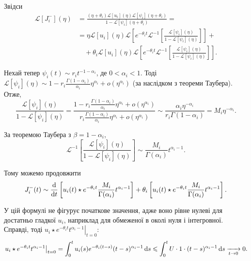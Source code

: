 Звідси
\begin{equation}
    \begin{aligned}
        \mathcal{L} [J_i^-](\eta)
        &= \frac{(\eta + \theta_i) \mathcal{L} [u_i](\eta) \mathcal{L}[\psi_i](\eta + \theta_i)}{1 - \mathcal{L} [\psi_i](\eta + \theta_i)} = \\
        &= \eta \mathcal{L} [u_i](\eta) \mathcal{L} \left[ e^{-\theta_i t} \mathcal{L}^{-1} \left[ \frac{\mathcal{L}[\psi_i](\eta)}{1 - \mathcal{L}[\psi_i](\eta)} \right] \right] + \\
        &\quad + \theta_i \mathcal{L} [u_i](\eta) \mathcal{L} \left[ e^{-\theta_i t} \mathcal{L}^{-1} \left[ \frac{\mathcal{L}[\psi_i](\eta)}{1 - \mathcal{L}[\psi_i](\eta)} \right] \right].
    \end{aligned}
\end{equation}

Нехай тепер $\psi_i(t) \sim r_i t^{-1 - \alpha_i}$, де $0 < \alpha_i < 1$. Тоді $\mathcal{L}[\psi_i](\eta) \sim 1 - r_i \frac{\Gamma(1 - \alpha_i)}{\alpha_i} \eta^{\alpha_i} + o(\eta^{\alpha_i})$ (за наслідком з теореми Таубера). Отже,
\begin{equation}
    \frac{\mathcal{L}[\psi_i](\eta)}{1 - \mathcal{L}[\psi_i](\eta)} = \frac{1 - r_i \frac{\Gamma(1 - \alpha_i)}{\alpha_i} \eta^{\alpha_i} + o(\eta^{\alpha_i})}{r_i \frac{\Gamma(1 - \alpha_i)}{\alpha_i} \eta^{\alpha_i} + o(\eta^{\alpha_i})} \sim \frac{\alpha_i \eta^{-\alpha_i}}{r_i \Gamma(1 - \alpha_i)} = M_i \eta^{-\alpha_i}.
\end{equation}

За теоремою Таубера з $\beta = 1 - \alpha_i$,
\begin{equation}
    \mathcal{L}^{-1} \left[ \frac{\mathcal{L}[\psi_i](\eta)}{1 - \mathcal{L}[\psi_i](\eta)} \right] \sim \frac{M_i}{\Gamma(\alpha_i)} t^{\alpha_i - 1}.
\end{equation}

Тому можемо продовжити
\begin{equation}
    J_i^-(t) \sim \frac{\mathop{}\!\mathrm{d}}{\mathop{}\!\mathrm{d} t} \left[ u_i(t) \star e^{-\theta_i t} \frac{M_i}{\Gamma(\alpha_i)} t^{\alpha_i - 1} \right] + \theta_i \left[ u_i(t) \star e^{-\theta_i t} \frac{M_i}{\Gamma(\alpha_i)} t^{\alpha_i - 1} \right].
\end{equation}

\begin{remark}
    У цій формулі не фігурує початкове значення, адже воно рівне нулеві для достатньо гладкої $u_i$, наприклад для обмеженої в околі нуля і інтегровної. Справді, тоді $\left. u_i \star e^{-\theta_i t} t^{\alpha_i - 1} \right|_{t = 0}$:
    \begin{equation}
        \left. u_i \star e^{-\theta_i t} t^{\alpha_i - 1} \right|_{t = 0} = \int_0^t u_i(s) e^{-\theta_i (t - s)} (t - s)^{\alpha_i - 1} \mathop{}\!\mathrm{d} s \leqslant \int_0^t U \cdot 1 \cdot (t - s)^{\alpha_i - 1} \mathop{}\!\mathrm{d} s \xrightarrow[t \to 0]{} 0.
    \end{equation}
\end{remark}

